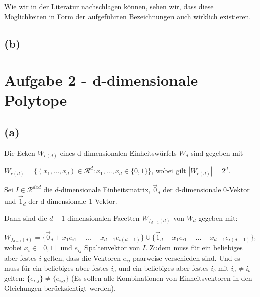\documentclass[a4paper]{article}
\begin{document}
 Wie wir in der Literatur nachschlagen können, sehen wir, dass diese Möglichkeiten 
 in Form der aufgeführten Bezeichnungen auch wirklich existieren.
  

\subsection*{(b)}
\begin{figure}[!htb]
\end{figure} 

\section*{Aufgabe 2 - d-dimensionale Polytope}

\subsection*{(a)}
Die Ecken $W_{c(d)}$ eines d-dimensionalen Einheitswürfels $W_d$ sind gegeben mit

$W_{c(d)}=\{(x_1, ..., x_d) \in \mathcal{R}^d : x_1, ..., x_d \in \{0, 1\}\}$, 
wobei gilt $|W_{c(d)}| = 2^d$.

Sei $I \in \mathcal{R}^{d x d}$ die $d$-dimensionale Einheitsmatrix, 
$\vec{0}_d$ der d-dimensionale 0-Vektor und $\vec{1}_d$ der d-dimensionale
1-Vektor.

Dann sind die $d-1$-dimensionalen Facetten $W_{f_{d-1}(d)}$ von $W_d$ gegeben mit:

$W_{f_{d-1}(d)} = \{\vec{0}_d + x_1 e_{i1} + ... + x_{d-1} e_{i(d-1)}\} \cup \{\vec{1}_d - x_1 e_{i1} - ... - x_{d-1} e_{i(d-1)}\}$, wobei $x_i \in [0,1]$ und $e_{ij}$ Spaltenvektor von $I$.
Zudem muss für ein beliebiges aber festes $i$ gelten, dass die Vektoren $e_{ij}$ paarweise
verschieden sind. Und es muss für ein beliebiges aber festes $i_a$ 
und ein beliebiges aber festes $i_b$ mit $i_a \neq i_b$ gelten: 
$\{e_{i_1j}\} \neq \{e_{i_2j}\}$ (Es sollen alle Kombinationen von Einheitsvektoren in den Gleichungen berücksichtigt werden).
\end{document}
